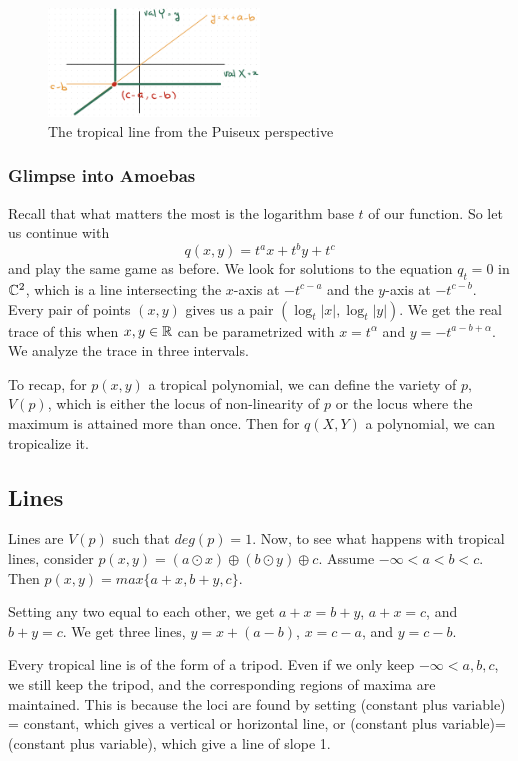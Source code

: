 \documentclass[12pt]{memoir}
\theoremstyle{definition}
\def\al{\alpha}
\begin{document}
\begin{figure}[h!]
    \centering
    \includegraphics[width=0.5\textwidth]{figs/fig7-2-TropicalLinePuiseuxExample.png}
    \caption{The tropical line from the Puiseux perspective}
    \label{fig:7.2-TropicalLinePuiseuxExample}
\end{figure}

\subsubsection{Glimpse into Amoebas}

Recall that what matters the most is the logarithm base $t$ of our function. So let us continue with 
$$q(x,y)=t^ax+t^by+t^c$$
and play the same game as before. We look for solutions to the equation $q_t=0$ in $\mathbb{C}^2$, which is a line intersecting the $x$-axis at $-t^{c-a}$ and the $y$-axis at $-t^{c-b}$. Every pair of points $(x,y)$ gives us a pair $(\log_t|x|,\log_t|y|)$. We get the real trace of this when $x,y\in\mathbb{R}$ can be parametrized with $x=t^\al$ and $y=-t^{a-b+\al}$. We analyze the trace in three intervals. 

To recap, for $p(x,y)$ a tropical polynomial, we can define the variety of $p,$ $V(p)$, which is either the locus of non-linearity of $p$ or the locus where the maximum is attained more than once. Then for $q(X,Y)$ a polynomial, we can tropicalize it.


\subsection{Lines}
Lines are $V(p)$ such that $deg(p)=1$.
Now, to see what happens with tropical lines, consider $p(x,y) = (a \odot x) \oplus (b \odot y) \oplus c$. Assume $-\infty<a<b<c$. Then $p(x,y) = max\{ a+x,b+y,c\}$.

Setting any two equal to each other, we get $a+x=b+y$, $a+x=c$, and $b+y=c$. We get three lines, $y=x+(a-b)$, $x=c-a$, and $y=c-b$.

Every tropical line is of the form of a tripod. Even if we only keep $-\infty< a,b,c$, we still keep the tripod, and the corresponding regions of maxima are maintained. This is because the loci are found by setting (constant plus variable) = constant, which gives a vertical or horizontal line, or (constant plus variable)=(constant plus variable), which give a line of slope 1.
\end{document}
